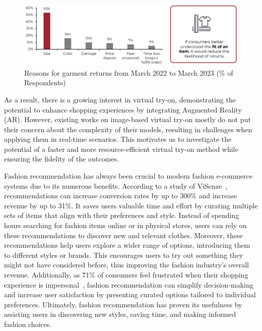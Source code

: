 \begin{figure}[h!]
    \centering
    \includegraphics[width=0.7\linewidth]{content/resources/images/introduction/motivation-try-on.png}
    \caption{Reasons for garment returns from March 2022 to March 2023 (\% of Respondents)}
    \label{fig:try-on-motivation}
\end{figure}

As a result, there is a growing interest in virtual try-on, demonstrating the potential to enhance shopping experiences by integrating Augmented Reality (AR). However, existing works on image-based virtual try-on mostly do not put their concern about the complexity of their models, resulting in challenges when applying them in real-time scenarios. This motivates us to investigate the potential of a faster and more resource-efficient virtual try-on method while ensuring the fidelity of the outcomes. 

Fashion recommendation has always been crucial to modern fashion e-commerce systems due to its numerous benefits. According to a study of ViSenze~\cite{web-recommendation-motivation}, recommendations can increase conversion rates by up to 300\% and increase revenue by up to 31\%. It saves users valuable time and effort by curating multiple sets of items that align with their preferences and style. Instead of spending hours searching for fashion items online or in physical stores, users can rely on these recommendations to discover new and relevant clothes. Moreover, these recommendations help users explore a wider range of options, introducing them to different styles or brands. This encourages users to try out something they might not have considered before, thus improving the fashion industry's overall revenue. Additionally, as 71\% of consumers feel frustrated when their shopping experience is impersonal~\cite{web-recommendation-motivation}, fashion recommendation can simplify decision-making and increase user satisfaction by presenting curated options tailored to individual preferences. Ultimately, fashion recommendation has proven its usefulness by assisting users in discovering new styles, saving time, and making informed fashion choices.

